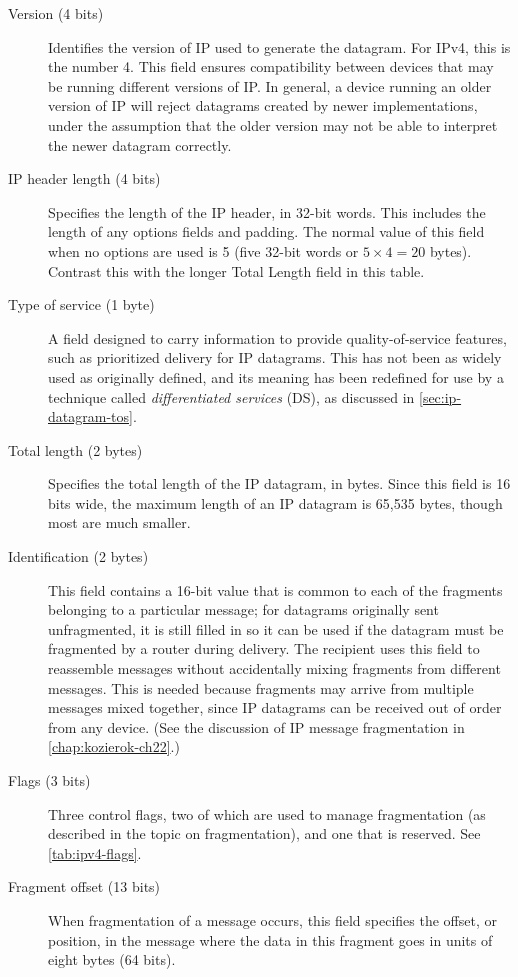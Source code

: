 \begin{description}
\item[Version (4 bits)]
   Identifies the version of IP used to generate the datagram.
   For IPv4, this is the number 4.
   This field ensures compatibility between devices that may be running different versions of IP.
   In general, a device running an older version of IP will reject datagrams created by newer implementations, under the assumption that the older version may not be able to interpret the newer datagram correctly.
\item[IP header length (4 bits)]
   Specifies the length of the IP header, in 32-bit words.
   This includes the length of any options fields and padding.
   The normal value of this field when no options are used is 5 (five 32-bit words or $5\times 4 = 20$ bytes).
   Contrast this with the longer Total Length field in this table.
\item[Type of service (1 byte)]
   A field designed to carry information to provide quality-of-service features, such as prioritized delivery for IP datagrams.
   This has not been as widely used as originally defined, and its meaning has been redefined for use by a technique called \emph{differentiated services} (DS), as discussed in \vref{sec:ip-datagram-tos}.
\item[Total length (2 bytes)]
   Specifies the total length of the IP datagram, in bytes.
   Since this field is 16 bits wide, the maximum length of an IP datagram is 65,535 bytes, though most are much smaller.
\item[Identification (2 bytes)]
   This field contains a 16-bit value that is common to each of the fragments belonging to a particular message;
   for datagrams originally sent unfragmented, it is still filled in so it can be used if the datagram must be fragmented by a router during delivery.
   The recipient uses this field to reassemble messages without accidentally mixing fragments from different messages.
   This is needed because fragments may arrive from multiple messages mixed together, since IP datagrams can be received out of order from any device.
   (See the discussion of IP message fragmentation in \cref{chap:kozierok-ch22}.)
\item[Flags (3 bits)]
   Three control flags, two of which are used to manage fragmentation (as described in the topic on fragmentation), and one that is reserved.
   See \vref{tab:ipv4-flags}.
\item[Fragment offset (13 bits)]
   When fragmentation of a message occurs, this field specifies the offset, or position, in the message where the data in this fragment goes in units of eight bytes (64 bits).

\end{description}
